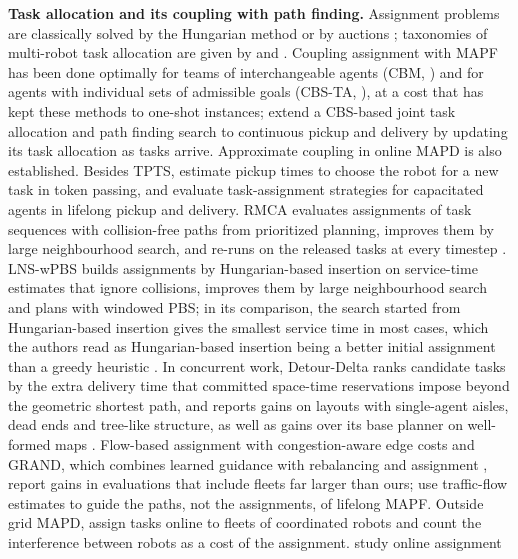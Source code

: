 \noindent\textbf{Task allocation and its coupling with path finding.}
Assignment problems are classically solved by the Hungarian method
\citep{kuhn1955hungarian,munkres1957algorithms,jonker1987shortest} or by
auctions \citep{bertsekas1988auction}; taxonomies of multi-robot task
allocation are given by \citet{gerkey2004formal} and
\citet{korsah2013comprehensive}. Coupling assignment with MAPF has been done
optimally for teams of interchangeable agents (CBM, \citealp{ma2016optimal})
and for agents with individual sets of admissible goals (CBS-TA,
\citealp{honig2018cbsta}), at a cost that has kept these methods to one-shot
instances; \citet{fan2025joint} extend a CBS-based joint task allocation and
path finding search to continuous pickup and delivery by updating its task
allocation as tasks arrive. Approximate coupling in online MAPD is also
established. Besides TPTS, \citet{shimokawa2022improvement} estimate pickup
times to choose the robot for a new task in token passing, and
\citet{cilden2025task} evaluate task-assignment strategies for capacitated
agents in lifelong pickup and delivery. RMCA evaluates
assignments of task sequences with collision-free paths from prioritized
planning, improves them by large neighbourhood search, and re-runs on the
released tasks at every timestep \citep{chen2021integrated}. LNS-wPBS builds
assignments by Hungarian-based insertion on service-time estimates that
ignore collisions, improves them by large neighbourhood search and plans
with windowed PBS; in its comparison, the search started from
Hungarian-based insertion gives the smallest service time in most cases,
which the authors read as Hungarian-based insertion being a better initial
assignment than a greedy heuristic
\citep{xu2022multigoal}. In concurrent work, Detour-Delta ranks candidate
tasks by the extra delivery time that committed space-time reservations
impose beyond the geometric shortest path, and reports gains on layouts with
single-agent aisles, dead ends and tree-like structure, as well as gains
over its base planner on well-formed maps \citep{hirayama2026detour}.
Flow-based assignment with congestion-aware edge costs \citep{zhang2026flow}
and GRAND, which combines learned guidance with rebalancing and assignment
\citep{gaber2026grand}, report gains in evaluations that include fleets far
larger than ours; \citet{chen2024traffic} use traffic-flow estimates to
guide the paths, not the assignments, of lifelong MAPF. Outside grid MAPD, \citet{forte2021online} assign tasks
online to fleets of coordinated robots and count the interference between
robots as a cost of the assignment. \citet{zhu2026combined} study online assignment
